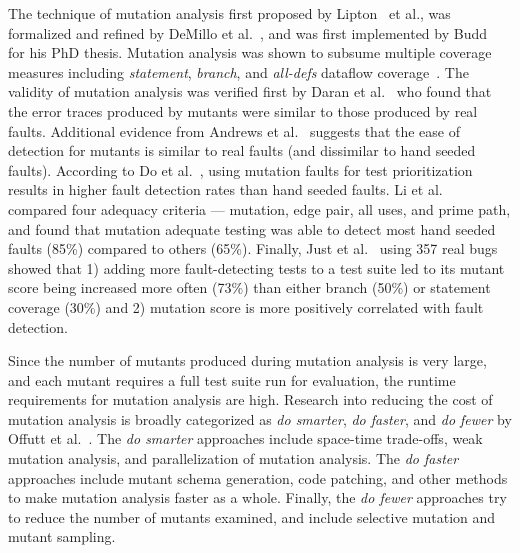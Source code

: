 \documentclass[conference]{IEEEtran}
\begin{document}
The technique of mutation analysis first proposed by
Lipton~\cite{lipton1971fault} et al., was formalized and refined by
DeMillo et al.~\cite{demillo1978hints}, and was
first implemented by Budd~\cite{budd1980theoretical} for his PhD thesis.
Mutation analysis was shown to subsume multiple coverage
measures including
\textit{statement}, \textit{branch}, and \textit{all-defs} dataflow
coverage~\cite{budd1980mutation,mathur1994empirical,offutt1996subsumption}.
The validity of mutation analysis was verified first by
Daran et al.~\cite{daran1996software} who found that the error traces produced
by mutants were similar to those produced by real faults. Additional evidence
from Andrews et al.~\cite{andrews2005mutation,andrews2006using} suggests
that the ease of detection for mutants is similar to real faults (and
dissimilar to hand seeded faults).
According to Do et al.~\cite{do2006on}, using mutation faults for test
prioritization results in higher fault detection rates than hand seeded faults.
Li et al.~\cite{li2009experimental} compared four adequacy criteria ---
mutation, edge pair, all uses, and prime path, and found that
mutation adequate testing was able to detect most hand seeded faults (85\%)
compared to others (65\%).
Finally, Just et al.~\cite{just2014mutants} using 357 real bugs showed that 1) adding more
fault-detecting tests to a test suite led to its mutant score being increased
more often (73\%) than either branch (50\%) or statement coverage (30\%)
and 2) mutation score is more positively correlated with fault detection.

Since the number of mutants produced during mutation analysis is very large,
and each mutant requires a full test suite run for evaluation, the runtime
requirements for mutation analysis are high. Research into
reducing the cost of mutation analysis is broadly categorized as
\textit{do smarter}, \textit{do faster}, and \textit{do fewer} by
Offutt et al.~\cite{offutt2001mutation}.
The \textit{do smarter} approaches include space-time trade-offs, weak
mutation analysis, and parallelization of mutation analysis. The \textit{do
faster} approaches include mutant schema generation, code patching, and
other methods to make mutation analysis faster as a whole. Finally, the
\textit{do fewer} approaches try to reduce the number of mutants examined,
and include selective mutation and mutant sampling.
\end{document}
